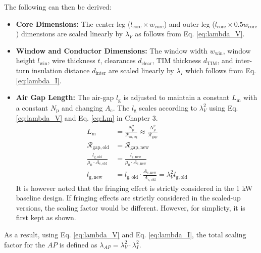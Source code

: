 The following can then be derived:
\begin{itemize}
    \item \textbf{Core Dimensions:} The center-leg ($l_{\mathrm{core}} \times w_{\mathrm{core}}$) and outer-leg ($l_{\mathrm{core}} \times 0.5w_{\mathrm{core}}$) dimensions are scaled linearly by $\lambda_V$ as follows from Eq. \ref{eq:lambda_V}.
    \item \textbf{Window and Conductor Dimensions:} The window width $w_{\mathrm{win}}$, window height $l_{\mathrm{win}}$, wire thickness $t$, clearances $d_{\mathrm{clear}}$, TIM thickness $d_{\mathrm{TIM}}$, and inter-turn insulation distance $d_{\mathrm{inter}}$ are scaled linearly by $\lambda_I$ which follows from Eq. \ref{eq:lambda_I}.
    \item \textbf{Air Gap Length:} The air-gap $l_{\mathrm{g}}$ is adjusted to maintain a constant $L_{\mathrm{m}}$ with a constant $N_\mathrm{p}$ and changing $A_{\mathrm{c}}$. The $l_\mathrm{g}$ scales according to $\lambda_V^2$ using Eq. \ref{eq:lambda_V} and Eq. \ref{eq:Lm} in Chapter 3. 
    \begin{align}
        L_{\mathrm{m}} &= \frac{N_\mathrm{p}^2}{ \mathcal{R}_\mathrm{m, eq}} \approx \frac{N_\mathrm{p}^2}{\mathcal{R}_\mathrm{gap}} \label{eq:Lm_approx} \\
        \mathcal{R}_\mathrm{gap, old} &= \mathcal{R}_\mathrm{gap, new} \\ 
        \frac{l_{\mathrm{g,old}}}{\mu_0 \cdot A_{\mathrm{c,old}}} &= \frac{l_{\mathrm{g,new}}}{\mu_0 \cdot A_{\mathrm{c,new}}} \label{eq:Rgap_const} \\
        l_{\mathrm{g,new}} &= l_{\mathrm{g,old}} \cdot \frac{A_{\mathrm{c,new}}}{A_{\mathrm{c,old}}} = \lambda_V^2 l_{\mathrm{g,old}} \label{eq:lg_scale}
    \end{align}
    It is however noted that the fringing effect is strictly considered in the 1 kW baseline design. If fringing effects are strictly considered in the scaled-up versions, the scaling factor would be different. However, for simplicty, it is first kept as shown. 
\end{itemize}

As a result, using Eq. \ref{eq:lambda_V} and Eq. \ref{eq:lambda_I}, the total scaling factor for the $AP$ is defined as $\lambda_{AP} = \lambda_V^2 \cdot \lambda_I^2$. 

